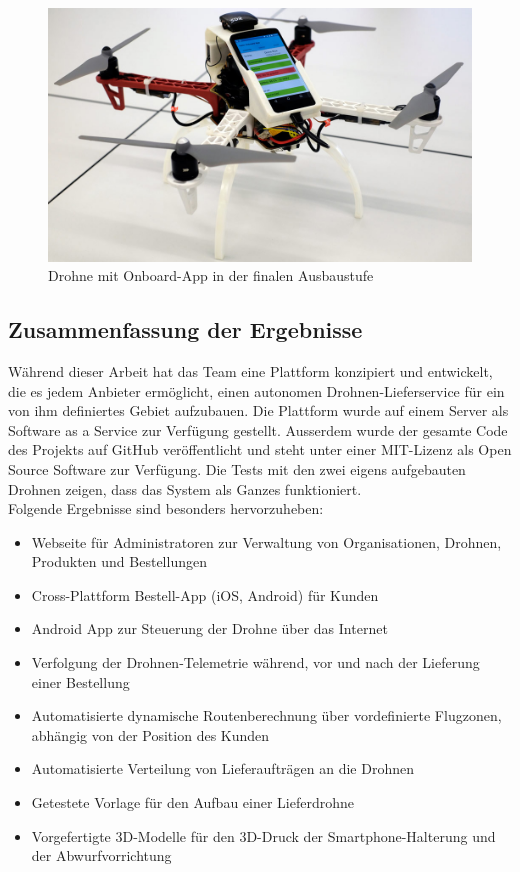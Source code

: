 \begin{figure}[H]
	\centering
	\includegraphics[width=1.0\textwidth] {images/drone.jpg}
	\caption{Drohne mit Onboard-App in der finalen Ausbaustufe}
\end{figure}


\newpage
\subsection{Zusammenfassung der Ergebnisse}

Während dieser Arbeit hat das Team eine Plattform konzipiert und entwickelt, die es jedem Anbieter ermöglicht, einen autonomen Drohnen-Lieferservice für ein von ihm definiertes Gebiet aufzubauen. Die Plattform wurde auf einem Server als Software as a Service zur Verfügung gestellt. Ausserdem wurde der gesamte Code des Projekts auf GitHub veröffentlicht und steht unter einer \Gls{MIT-Lizenz} als Open Source Software zur Verfügung. Die Tests mit den zwei eigens aufgebauten Drohnen zeigen, dass das System als Ganzes funktioniert. \\

Folgende Ergebnisse sind besonders hervorzuheben:

\begin{itemize}
	\item Webseite für Administratoren zur Verwaltung von Organisationen, Drohnen, Produkten und Bestellungen
	\item Cross-Plattform Bestell-App (iOS, Android) für Kunden
	\item Android App zur Steuerung der Drohne über das Internet
	\item Verfolgung der Drohnen-Telemetrie während, vor und nach der Lieferung einer Bestellung
	\item Automatisierte dynamische Routenberechnung über vordefinierte Flugzonen, abhängig von der Position des Kunden
	\item Automatisierte Verteilung von Lieferaufträgen an die Drohnen
	\item Getestete Vorlage für den Aufbau einer Lieferdrohne
	\item Vorgefertigte 3D-Modelle für den 3D-Druck der Smartphone-Halterung und der Abwurfvorrichtung
\end{itemize}

